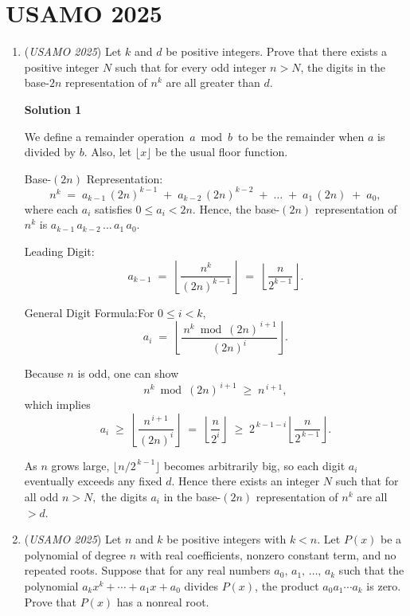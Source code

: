 \section{USAMO 2025}
        \begin{enumerate}
        	\item (\textit{USAMO 2025}) Let $k$ and $d$ be positive integers. Prove that there exists a positive integer $N$ such that for every odd integer $n>N$, the digits in the base-$2n$ representation of $n^k$ are all greater than $d$.


 



\textbf{Solution 1}

We define a remainder operation $\,a \bmod b\,$ to be the remainder when $a$ is divided by $b$. Also, let $\lfloor x\rfloor$ be the usual floor function.

 Base-$(2n)$ Representation:
 \[n^k \;=\; a_{k-1}\,(2n)^{k-1} \;+\; a_{k-2}\,(2n)^{k-2} \;+\;\dots\;+\;a_1\,(2n)\;+\;a_0,\]where each $a_i$ satisfies $0 \le a_i < 2n.$  Hence, the base-$(2n)$ representation of $n^k$ is $a_{k-1}\,a_{k-2}\,\dots\,a_1\,a_0.$

 Leading Digit:
 \[a_{k-1}  \;=\;  \left\lfloor  \dfrac{n^k}{(2n)^{k-1}} \right\rfloor \;=\; \left\lfloor \dfrac{n}{2^{k-1}} \right\rfloor.\]

 General Digit Formula:For $0 \le i < k,$
 \[a_i  \;=\; \left\lfloor  \dfrac{\,n^k \bmod (2n)^{\,i+1}}{(2n)^i} \right\rfloor.\]

 Because $n$ is odd, one can show 
 \[n^k \bmod (2n)^{\,i+1} \;\ge\; n^{\,i+1},\]which implies
 \[a_i  \;\ge\; \left\lfloor \dfrac{n^{\,i+1}}{(2n)^i} \right\rfloor \;=\; \left\lfloor \dfrac{n}{2^i} \right\rfloor \;\ge\; 2^{\,k-1-i} \left\lfloor \dfrac{n}{2^{\,k-1}} \right\rfloor.\]

 As $n$ grows large, $\bigl\lfloor n / 2^{\,k-1}\bigr\rfloor$  becomes arbitrarily big, so each digit $a_i$ eventually exceeds any fixed $d.$  Hence there exists an integer $N$ such that for all odd $n > N,$ the digits $a_i$ in the base-$(2n)$ representation of $n^k$ are all $> d.$



	\item (\textit{USAMO 2025}) Let $n$ and $k$ be positive integers with $k<n$. Let $P(x)$ be a polynomial of degree $n$ with real coefficients, nonzero constant term, and no repeated roots. Suppose that for any real numbers $a_0,\,a_1,\,\ldots,\,a_k$ such that the polynomial $a_kx^k+\cdots+a_1x+a_0$ divides $P(x)$, the product $a_0a_1\cdots a_k$ is zero. Prove that $P(x)$ has a nonreal root.



\end{enumerate}
